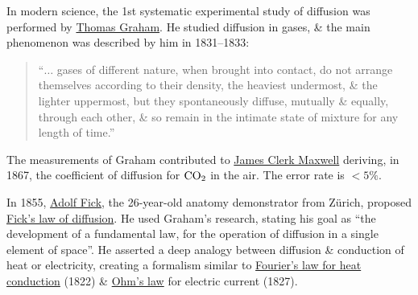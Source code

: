\documentclass{article}
\begin{document}
In modern science, the 1st systematic experimental study of diffusion was performed by \href{https://en.wikipedia.org/wiki/Thomas_Graham_(chemist)}{\sc Thomas Graham}. He studied diffusion in gases, \& the main phenomenon was described by him in 1831--1833:
\begin{quote}
	``$\ldots$ gases of different nature, when brought into contact, do not arrange themselves according to their density, the heaviest undermost, \& the lighter uppermost, but they spontaneously diffuse, mutually \& equally, through each other, \& so remain in the intimate state of mixture for any length of time.''
\end{quote}
The measurements of Graham contributed to \href{https://en.wikipedia.org/wiki/James_Clerk_Maxwell}{\sc James Clerk Maxwell} deriving, in 1867, the coefficient of diffusion for $\rm CO_2$ in the air. The error rate is $< 5\%$.

In 1855, \href{https://en.wikipedia.org/wiki/Adolf_Fick}{\sc Adolf Fick}, the 26-year-old anatomy demonstrator from Z\"urich, proposed \href{https://en.wikipedia.org/wiki/Fick%27s_laws_of_diffusion}{Fick's law of diffusion}. He used Graham's research, stating his goal as ``the development of a fundamental law, for the operation of diffusion in a single element of space''. He asserted a deep analogy between diffusion \& conduction of heat or electricity, creating a formalism similar to \href{https://en.wikipedia.org/wiki/Thermal_conduction}{Fourier's law for heat conduction} (1822) \& \href{https://en.wikipedia.org/wiki/Ohm%27s_law}{Ohm's law} for electric current (1827).
\end{document}
